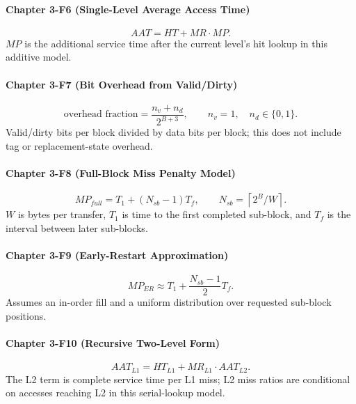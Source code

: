 \paragraph{Chapter 3-F6 (Single-Level Average Access Time)}\label{par:auto-059}
\begin{equation}\label{eq:auto-071}
    AAT=HT+MR\cdot MP.
\end{equation}
$MP$ is the additional service time after the current level's hit lookup in this additive model.

\paragraph{Chapter 3-F7 (Bit Overhead from Valid/Dirty)}\label{par:auto-060}
\begin{equation}\label{eq:auto-072}
    \text{overhead fraction}=\frac{n_v+n_d}{2^{B+3}},\qquad
    n_v=1,\quad n_d\in\{0,1\}.
\end{equation}
Valid/dirty bits per block divided by data bits per block; this does not include tag or replacement-state overhead.

\paragraph{Chapter 3-F8 (Full-Block Miss Penalty Model)}\label{par:auto-061}
\begin{equation}\label{eq:auto-073}
    MP_{full}=T_1+(N_{sb}-1)T_f,\qquad N_{sb}=\left\lceil 2^B/W\right\rceil.
\end{equation}
$W$ is bytes per transfer, $T_1$ is time to the first completed sub-block, and $T_f$ is the interval between later sub-blocks.

\paragraph{Chapter 3-F9 (Early-Restart Approximation)}\label{par:auto-062}
\begin{equation}\label{eq:auto-074}
    MP_{ER}\approx T_1+\frac{N_{sb}-1}{2}T_f.
\end{equation}
Assumes an in-order fill and a uniform distribution over requested sub-block positions.

\paragraph{Chapter 3-F10 (Recursive Two-Level Form)}\label{par:auto-063}
\begin{equation}\label{eq:auto-075}
    AAT_{L1}=HT_{L1}+MR_{L1}\cdot AAT_{L2}.
\end{equation}
The L2 term is complete service time per L1 miss; L2 miss ratios are conditional on accesses reaching L2 in this serial-lookup model.


